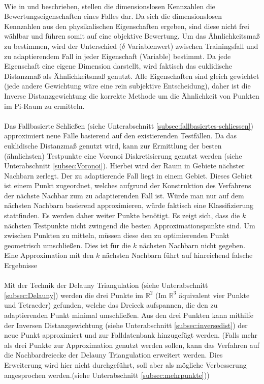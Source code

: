 \parskip 12pt \\
Wie in \cite{RH98a} und \cite{Rud02} beschrieben, stellen die dimensionslosen Kennzahlen die Bewertungseigenschaften eines Falles dar. Da sich die dimensionslosen Kennzahlen aus den physikalischen Eigenschaften ergeben, sind diese nicht frei wählbar und führen somit auf eine objektive Bewertung. Um das Ähnlichkeitsmaß zu bestimmen, wird der Unterschied ($\delta$ Variablenwert) zwischen Trainingsfall und zu adaptierendem Fall in jeder Eigenschaft (Variable) bestimmt. Da jede Eigenschaft eine eigene Dimension darstellt, wird faktisch das euklidische Distanzmaß als Ähnlichkeitsmaß genutzt. Alle Eigenschaften sind gleich gewichtet (jede andere Gewichtung wäre eine rein subjektive Entscheidung), daher ist die Inverse Distanzgewichtung die korrekte Methode um die Ähnlichkeit von Punkten im Pi-Raum zu ermitteln.\\
\parskip 12pt \\
Das Fallbasierte Schließen (siehe Unterabschnitt \ref{subsec:fallbasiertes-schliessen}) approximiert neue Fälle basierend auf den existierenden Testfällen. Da das euklidische Distanzmaß genutzt wird, kann zur Ermittlung der besten (ähnlichsten) Testpunkte eine Voronoi Diskretisierung genutzt werden (siehe Unterabschnitt \ref{subsec:Voronoi}). Hierbei wird der Raum in Gebiete nächster Nachbarn zerlegt. Der zu adaptierende Fall liegt in einem Gebiet. Dieses Gebiet ist einem Punkt zugeordnet, welches aufgrund der Konstruktion des Verfahrens der nächste Nachbar zum zu adaptierenden Fall ist. Würde man nur auf dem nächsten Nachbarn basierend approximieren, würde faktisch eine Klassifizierung stattfinden. Es werden daher weiter Punkte benötigt. Es zeigt sich, dass die $k$ nächsten Testpunkte nicht zwingend die besten Approximationspunkte sind. Um zwischen Punkten zu mitteln, müssen diese den zu optimierenden Punkt geometrisch umschließen. Dies ist für die $k$ nächsten Nachbarn nicht gegeben. Eine Approximation mit den $k$ nächsten Nachbarn führt auf hinreichend falsche Ergebnisse\\
\parskip 12pt \\
Mit der Technik der Delauny Triangulation (siehe Unterabschnitt \ref{subsec:Delauny}) werden die drei Punkte im $\mathbb{R}^2$ (Im $\mathbb{R}^3$ äquivalent vier Punkte und Tetraeder)  gefunden, welche das Dreieck aufspannen, die den zu adaptierenden Punkt minimal umschließen. Aus den drei Punkten kann mithilfe der Inversen Distanzgewichtung (siehe Unterabschnitt \ref{subsec:inversedist}) der neue Punkt approximiert und zur Falldatenbank hinzugefügt werden. (Falls mehr als drei Punkte zur Approximation genutzt werden sollen, kann das Verfahren auf die Nachbardreiecke der Delauny Triangulation erweitert werden. Dies Erweiterung wird hier nicht durchgeführt, soll aber als mögliche Verbesserung angesprochen werden.(siehe Unterabschnitt \ref{subsec:mehrpunkte}))\\
